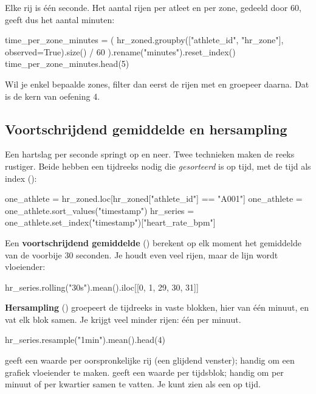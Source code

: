 \documentclass[11pt,a4paper]{article}
\begin{document}
Elke rij is één seconde. Het aantal rijen per atleet en per zone, gedeeld
door 60, geeft dus het aantal minuten:

\begin{python}
time_per_zone_minutes = (
    hr_zoned.groupby(["athlete_id", "hr_zone"], observed=True).size() / 60
).rename("minutes").reset_index()
time_per_zone_minutes.head(5)
\end{python}

Wil je enkel bepaalde zones, filter dan eerst de rijen met
 en groepeer daarna. Dat is de kern van oefening 4.

\subsection{Voortschrijdend gemiddelde en hersampling}

Een hartslag per seconde springt op en neer. Twee technieken maken de
reeks rustiger. Beide hebben een tijdreeks nodig die \emph{gesorteerd} is
op tijd, met de tijd als index ():

\begin{python}[noout]
one_athlete = hr_zoned.loc[hr_zoned["athlete_id"] == "A001"]
one_athlete = one_athlete.sort_values("timestamp")
hr_series = one_athlete.set_index("timestamp")["heart_rate_bpm"]
\end{python}

Een \textbf{voortschrijdend gemiddelde} () berekent op elk
moment het gemiddelde van de voorbije 30 seconden. Je houdt even veel
rijen, maar de lijn wordt vloeiender:

\begin{python}
hr_series.rolling("30s").mean().iloc[[0, 1, 29, 30, 31]]
\end{python}

\textbf{Hersampling} () groepeert de tijdreeks in vaste
blokken, hier van één minuut, en vat elk blok samen. Je krijgt veel
minder rijen: één per minuut.

\begin{python}
hr_series.resample("1min").mean().head(4)
\end{python}

\begin{kernidee}
 geeft een waarde per oorspronkelijke rij (een glijdend
venster); handig om een grafiek vloeiender te maken.
 geeft een waarde per tijdsblok; handig om per minuut of
per kwartier samen te vatten. Je kunt  zien als een
 op tijd.
\end{kernidee}
\end{document}
